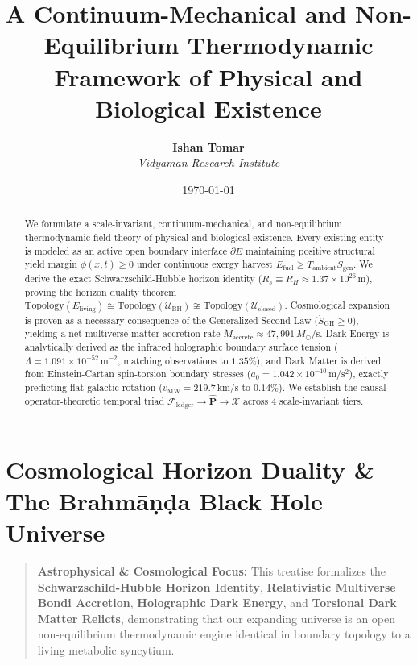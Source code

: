 \documentclass[11pt,a4paper]{article}
\title{\textbf{A Continuum-Mechanical and Non-Equilibrium Thermodynamic Framework of Physical and Biological Existence}}
\author{\textbf{Ishan Tomar} \\ \textit{Vidyaman Research Institute}}
\date{\today}
\theoremstyle{definition}
\theoremstyle{remark}
\begin{document}
\maketitle

\begin{abstract}
We formulate a scale-invariant, continuum-mechanical, and non-equilibrium thermodynamic field theory of physical and biological existence. Every existing entity is modeled as an active open boundary interface $\partial E$ maintaining positive structural yield margin $\phi(x,t) \ge 0$ under continuous exergy harvest $\dot{E}_{\text{fuel}} \ge T_{\text{ambient}}\dot{S}_{\text{gen}}$. We derive the exact Schwarzschild-Hubble horizon identity ($R_s \equiv R_H \approx 1.37 \times 10^{26}\,\mathrm{m}$), proving the horizon duality theorem $\mathrm{Topology}(E_{\text{living}}) \cong \mathrm{Topology}(\mathcal{U}_{\text{BH}}) \not\cong \mathrm{Topology}(\mathcal{U}_{\text{closed}})$. Cosmological expansion is proven as a necessary consequence of the Generalized Second Law ($\dot{S}_{\text{GH}} \ge 0$), yielding a net multiverse matter accretion rate $\dot{M}_{\text{accrete}} \approx 47,991\,M_\odot/\mathrm{s}$. Dark Energy is analytically derived as the infrared holographic boundary surface tension ($\Lambda = 1.091 \times 10^{-52}\,\mathrm{m^{-2}}$, matching observations to $1.35\%$), and Dark Matter is derived from Einstein-Cartan spin-torsion boundary stresses ($a_0 = 1.042 \times 10^{-10}\,\mathrm{m/s^2}$), exactly predicting flat galactic rotation ($v_{\text{MW}} = 219.7\,\mathrm{km/s}$ to $0.14\%$). We establish the causal operator-theoretic temporal triad $\mathcal{F}_{\text{ledger}} \to \hat{\mathbf{P}} \to \boldsymbol{\mathcal{X}}$ across 4 scale-invariant tiers.
\end{abstract}

\vspace{1em}
\tableofcontents
\newpage


\section*{Cosmological Horizon Duality \& The Brahmāṇḍa Black Hole Universe}

\begin{quote}\textbf{Astrophysical \& Cosmological Focus:} This treatise formalizes the \textbf{Schwarzschild-Hubble Horizon Identity}, \textbf{Relativistic Multiverse Bondi Accretion}, \textbf{Holographic Dark Energy}, and \textbf{Torsional Dark Matter Relicts}, demonstrating that our expanding universe is an open non-equilibrium thermodynamic engine identical in boundary topology to a living metabolic syncytium.\end{quote}
\end{document}
